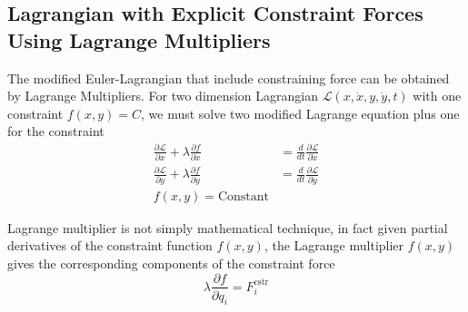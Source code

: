 \documentclass[../../../main.tex]{subfiles}
\begin{document}
\subsection*{Lagrangian with Explicit Constraint Forces Using Lagrange Multipliers}
The modified Euler-Lagrangian that include constraining force can be obtained by Lagrange Multipliers.
For two dimension Lagrangian $\mathcal{L}(x,\dot{x},y,\dot{y},t)$ with one constraint $f(x,y)=C$, we must solve two modified Lagrange equation plus one for the constraint
\begin{align*}
	\frac{\partial \mathcal{L}}{\partial x}+\lambda\frac{\partial f}{\partial x} & =\frac{d}{dt}\frac{\partial \mathcal{L}}{\partial \dot{x}} \\
	\frac{\partial \mathcal{L}}{\partial y}+\lambda\frac{\partial f}{\partial y} & =\frac{d}{dt}\frac{\partial \mathcal{L}}{\partial \dot{y}} \\
	f(x,y)=\text{Constant}
\end{align*}

Lagrange multiplier is not simply mathematical technique, in fact given partial derivatives of the constraint function $f (x, y)$, the Lagrange multiplier $f(x,y)$ gives the corresponding components of the constraint force
\begin{equation*}
	\lambda\frac{\partial f}{\partial q_i}=F_i^{\text{cstr}}
\end{equation*}
\end{document}
